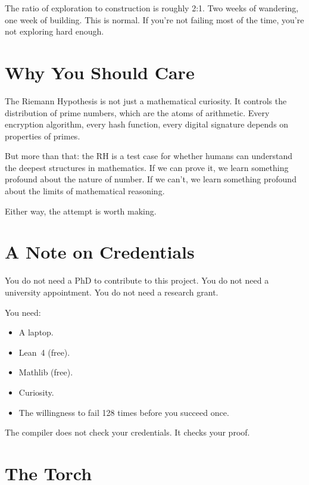 \documentclass[11pt,a4paper]{article}
\begin{document}
The ratio of exploration to construction is roughly 2:1. Two weeks
of wandering, one week of building. This is normal. If you're not
failing most of the time, you're not exploring hard enough.

\section*{Why You Should Care}

The Riemann Hypothesis is not just a mathematical curiosity. It
controls the distribution of prime numbers, which are the atoms
of arithmetic. Every encryption algorithm, every hash function,
every digital signature depends on properties of primes.

But more than that: the RH is a test case for whether humans can
understand the deepest structures in mathematics. If we can prove
it, we learn something profound about the nature of number. If we
can't, we learn something profound about the limits of mathematical
reasoning.

Either way, the attempt is worth making.

\section*{A Note on Credentials}

You do not need a PhD to contribute to this project. You do not
need a university appointment. You do not need a research grant.

You need:
\begin{itemize}
  \item A laptop.
  \item Lean~4 (free).
  \item Mathlib (free).
  \item Curiosity.
  \item The willingness to fail 128 times before you succeed once.
\end{itemize}

The compiler does not check your credentials. It checks your proof.

\section*{The Torch}
\end{document}

